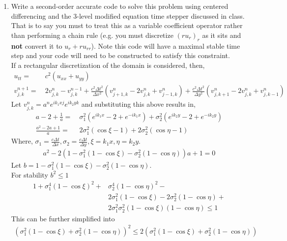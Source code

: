 \documentclass[11pt]{article}
\newcommand{\dx}{\Delta x}
\newcommand{\dy}{\Delta y}
\newcommand{\dt}{\Delta t}
\newcommand{\vd}[2]{v^{#1}_{#2}}
\newcommand{\vnd}[1]{v^{n}_{#1}}
\newcommand{\bra}[1]{\left(#1\right)}
\begin{document}
\begin{enumerate}
    \begin{enumerate}
      \item {\color{blue}Write a second-order accurate code to solve this problem using centered differencing and the 3-level modified equation time stepper discussed in class. That is to say you must to treat this as a variable coefficient operator rather than performing a chain rule (e.g. you must discretize $(ru_r)_r$ as it sits and {\bf not} convert it to $u_r+ru_{rr}$). Note this code will have a maximal stable time step and your code will need to be constructed to satisfy this constraint.}\\
      If a rectangular discretization of the domain is considered, then,
      \begin{align*}
          u_{tt} =& \ c^2\bra{u_{xx} + u_{yy}} \\
          \vd{n+1}{j,k} =& \ 2\vd{n}{j,k}-\vd{n-1}{j,k} + \frac{c^2\dt^2}{\dx^2}\bra{\vnd{j+1,k}-2\vnd{j,k}+\vnd{j-1,k}} + \frac{c^2\dt^2}{\dy^2}\bra{\vnd{j,k+1}-2\vnd{j,k}+\vnd{j,k-1}}
      \end{align*}
      Let $\vnd{j,k} = a^{n}e^{ik_1xj}e^{ik_2yk}$ and substituting this above results in,
      \begin{align*}
          a-2+\frac{1}{a} =& \ \sigma_1^2\bra{e^{ik_1x}-2+e^{-ik_1x}} + \sigma_2^2\bra{e^{ik_2y}-2+e^{-ik_2y}} \\
          \frac{a^2-2a+1}{a} =& \ 2\sigma_1^2\bra{\cos{\xi}-1} + 2\sigma_2^2\bra{\cos{\eta}-1}
      \end{align*}
      Where, $\sigma_1 = \frac{c\dt}{\dx}, \sigma_2 = \frac{c\dt}{\dy}, \xi = k_1x, \eta = k_2y$.
      \begin{align*}
          a^2-2\bra{1-\sigma_1^2\bra{1-\cos{\xi}} - \sigma_2^2\bra{1-\cos{\eta}}}a + 1 =0
      \end{align*}
      Let $b = 1-\sigma_1^2\bra{1-\cos{\xi}} - \sigma_2^2\bra{1-\cos{\eta}}$.\\
      For stability $b^2\leq 1$
      \begin{align*}
          1+\sigma_1^4(1-\cos\xi)^2+&\sigma_2^4(1-\cos\eta)^2-\\
          & 2\sigma_1^2(1-\cos\xi)-2\sigma_2^2(1-\cos\eta)+\\
          & 2\sigma_1^2\sigma_2^2(1-\cos\xi)(1-\cos\eta)\leq 1
      \end{align*}
      This can be further simplified into
      \begin{align*}
          \bra{\sigma_1^2(1-\cos\xi)+\sigma_2^2(1-\cos\eta)}^2 \leq 2\bra{\sigma_1^2(1-\cos\xi)+\sigma_2^2(1-\cos\eta)}

\end{align*}
\end{enumerate}
\end{enumerate}
\end{document}
